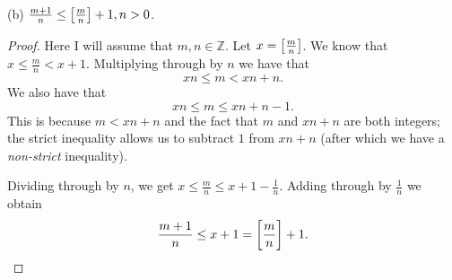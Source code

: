 \documentclass{article}
\newcommand{\Z}{\mathbb{Z}}
\begin{document}
\vspace{5mm}

(b) $\frac{m + 1}{n} \leq \sbr{\frac{m}{n}} + 1, n > 0$.

\begin{proof}

Here I will assume that $m, n \in \Z$. Let $x = \sbr{\frac{m}{n}}$. We
know that $x \leq \frac{m}{n} < x + 1$. Multiplying through by $n$ we
have that
%
\begin{equation}
    x n \leq m < x n + n
    .
    \label{eq:5b}
\end{equation}
%
We also have that
%
\begin{equation*}
    x n \leq m \leq x n + n - 1
    .
\end{equation*}
%
This is because $m < xn + n$ and the fact that $m$ and $xn + n$ are both
integers; the strict inequality allows us to subtract $1$ from $xn + n$
(after which we have a \textit{non-strict} inequality).

Dividing through by $n$, we get
$x \leq \frac{m}{n} \leq x + 1 - \frac{1}{n}$. Adding through by
$\frac{1}{n}$ we obtain
%
\begin{equation*}
    \frac{m + 1}{n} \leq x + 1 = \sbr{\frac{m}{n}} + 1
    .
\end{equation*}

\end{proof}
\end{document}
